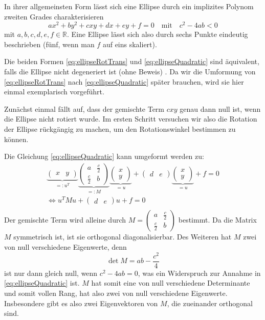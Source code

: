In ihrer allgemeinsten Form lässt sich eine Ellipse durch ein implizites Polynom zweiten Grades charakterisieren
\begin{equation} \label{eq:ellipseQuadratic}
ax^2 + by^2 + cxy + dx + ey + f = 0 \quad \text{mit}\quad c^2-4ab < 0
\end{equation} 
mit $a,b,c,d,e,f \in \mathbb{R}$. Eine Ellipse lässt sich also durch sechs Punkte eindeutig beschrieben (fünf, wenn man $f$ auf eins skaliert).


Die beiden Formen \ref{eq:ellipseRotTrans} und \ref{eq:ellipseQuadratic} sind äquivalent, falls die Ellipse nicht degeneriert ist (ohne Beweis) \cite{Lawrence1972}. Da wir die Umformung von \ref{eq:ellipseRotTrans} nach \ref{eq:ellipseQuadratic} später brauchen, wird sie hier einmal exemplarisch vorgeführt. 

Zunächst einmal fällt auf, dass der gemischte Term $cxy$ genau dann null ist, wenn die Ellipse nicht rotiert wurde. Im ersten Schritt versuchen wir also die Rotation der Ellipse rückgängig zu machen, um den Rotationswinkel bestimmen zu können.

Die Gleichung \ref{eq:ellipseQuadratic} kann umgeformt werden zu:
\begin{equation*}
\begin{aligned}
\underbrace{\begin{pmatrix}x & y\end{pmatrix}}_{=:u^T}\underbrace{\begin{pmatrix}a & \frac{c}{2} \\ \frac{c}{2} & b\end{pmatrix}}_{=: M}\underbrace{\begin{pmatrix}x \\ y\end{pmatrix}}_{=u} +\begin{pmatrix}d & e\end{pmatrix}\underbrace{\begin{pmatrix}x \\ y\end{pmatrix}}_{=u}+ f = 0 \\
\Leftrightarrow u^TMu +\begin{pmatrix}d & e\end{pmatrix}u + f = 0 \\
\end{aligned}
\end{equation*} 
Der gemischte Term wird alleine durch $M = \begin{pmatrix}a & \frac{c}{2} \\ \frac{c}{2} & b\end{pmatrix}$ bestimmt. Da die Matrix $M$ symmetrisch ist, ist sie orthogonal diagonalisierbar. Des Weiteren hat $M$ zwei von null verschiedene Eigenwerte, denn 
\[
\det M = ab - \dfrac{c^2}{4}
\] ist nur dann gleich null, wenn $c^2 - 4ab = 0$, was ein Widerspruch zur Annahme in \ref{eq:ellipseQuadratic} ist. $M$ hat somit eine von null verschiedene Determinante und somit vollen Rang, hat also zwei von null verschiedene Eigenwerte. Insbesondere gibt es also zwei Eigenvektoren von $M$, die zueinander orthogonal sind.

